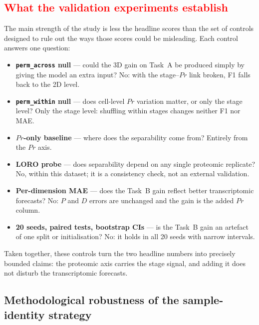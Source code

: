 \documentclass[5p,times,twocolumn]{elsarticle}
\newcommand{\rtag}[1]{}
\newcommand{\rev}[2]{\rtag{#1}\textcolor{red}{#2}}
\newenvironment{revblock}[1]{\par\color{red}\rtag{#1}\ignorespaces}{\par}
\begin{document}
\subsection{\rev{R2.15,R1.10}{\textbf{What the validation
      experiments establish}}}
\label{sec:disc_validation}

\begin{revblock}{R2.15,R1.10}
  The main strength of the study is less the headline scores
  than the set of controls designed to rule out the ways those
  scores could be misleading. Each control answers one question:
  \begin{itemize}
    \item \textbf{\texttt{perm\_across} null} --- could the 3D
    gain on Task~A be produced simply by giving the model an
    extra input? No: with the stage--$Pr$ link broken, F1 falls
    back to the 2D level.
    \item \textbf{\texttt{perm\_within} null} --- does cell-level
    $Pr$ variation matter, or only the stage level? Only the
    stage level: shuffling within stages changes neither F1 nor
    MAE.
    \item \textbf{$Pr$-only baseline} --- where does the
    separability come from? Entirely from the $Pr$ axis.
    \item \textbf{LORO probe} --- does separability depend on
    any single proteomic replicate? No, within this dataset;
    it is a consistency check, not an external validation.
    \item \textbf{Per-dimension MAE} --- does the Task~B gain
    reflect better transcriptomic forecasts? No: $P$ and $D$
    errors are unchanged and the gain is the added $Pr$ column.
    \item \textbf{20 seeds, paired tests, bootstrap CIs} --- is
    the Task~B gain an artefact of one split or
    initialisation? No: it holds in all 20 seeds with narrow
    intervals.
  \end{itemize}
  Taken together, these controls turn the two headline numbers
  into precisely bounded claims: the proteomic axis carries the
  stage signal, and adding it does not disturb the
  transcriptomic forecasts.
\end{revblock}

\subsection{\textbf{Methodological robustness of the
    sample-identity strategy}}
\end{document}
